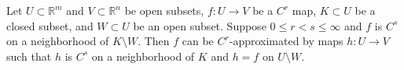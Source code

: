 Let $U \subset \mathbb{R}^m$ and $V \subset \mathbb{R}^n$ be open subsets, $f: U \to V$ be a $C^r$ map, $K \subset U$ be a closed subset, and $W \subset U$ be an open subset. Suppose $0 \leqslant r < s \leqslant \infty$ and $f$ is $C^s$ on a neighborhood of $K \setminus W$. Then $f$ can be $C^r$-approximated by maps $h: U \to V$ such that $h$ is $C^s$ on a neighborhood of $K$ and $h = f$ on $U \setminus W$.
